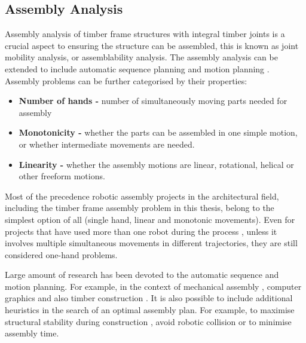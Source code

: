 \subsection{Assembly Analysis}

Assembly analysis of timber frame structures with integral timber joints is a crucial aspect to ensuring the structure can be assembled, this is known as joint mobility analysis, or assemblability analysis. The assembly analysis can be extended to include automatic sequence planning and motion planning \parencite{wangStateArtComputational2021}. Assembly problems can be further categorised \parencite{wangStateArtComputational2021} by their properties: 

\begin{itemize}
	\item \textbf{Number of hands -} number of simultaneously moving parts needed for assembly 

	\item \textbf{Monotonicity -} whether the parts can be assembled in one simple motion, or whether intermediate movements are needed.

	\item \textbf{Linearity -} whether the assembly motions are linear, rotational, helical or other freeform motions. 

\end{itemize}
Most of the precedence robotic assembly projects in the architectural field, including the timber frame assembly problem in this thesis, belong to the simplest option of all (single hand, linear and monotonic movements). Even for projects that have used more than one robot during the process \parencite{paraschoCooperativeRoboticAssembly2019, thomaRoboticFabricationBespoke2018}, unless it involves multiple simultaneous movements in different trajectories, they are still considered one-hand problems.


Large amount of research has been devoted to the automatic sequence and motion planning. For example, in the context of mechanical assembly \parencite{bahubalendruniReviewAssemblySequence2016, defazioSimplifiedGenerationAll1987, homemdemelloTaskSequencePlanning1989, wilsonGeometricAssemblyPlanning1992b}, computer graphics \parencite{natarajanPlanningAssemblies1988, wangDESIAGeneralFramework2018} and also timber construction \parencite{taiDesignAssemblyComputational2012}. It is also possible to include additional heuristics in the search of an optimal assembly plan. For example, to maximise structural stability during construction \parencite{deussAssemblingSelfsupportingStructures2014, garrettScalableProbabilisticallyComplete2020}, avoid robotic collision \parencite{huangFrameFabRoboticFabrication2016, yuHighlyInformedRobotic2016} or to minimise assembly time.

